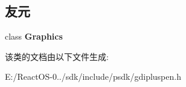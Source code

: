 \subsection*{友元}
\begin{DoxyCompactItemize}
\item 
\mbox{\label{class_pen_ae5cfe0c0e0b06d536d5814bd1ff4818f}} 
class {\bfseries Graphics}
\end{DoxyCompactItemize}


该类的文档由以下文件生成\+:\begin{DoxyCompactItemize}
\item 
E\+:/\+React\+O\+S-\/0../sdk/include/psdk/gdipluspen.\+h\end{DoxyCompactItemize}
